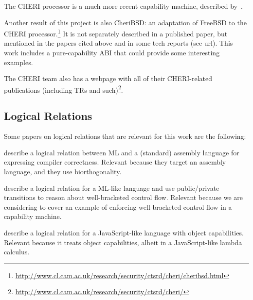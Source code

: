 \documentclass[a4paper]{article}
\begin{document}
The CHERI processor is a much more recent capability machine, described
by~\cite{Woodruff:2014:CCM:2665671.2665740,Watson2015Cheri}.

Another result of this project is also CheriBSD: an adaptation of FreeBSD to the
CHERI
processor.\footnote{\url{http://www.cl.cam.ac.uk/research/security/ctsrd/cheri/cheribsd.html}}
It is not separately described in a published paper, but mentioned in the papers
cited above and in some tech reports (see url). This work includes a
pure-capability ABI that could provide some interesting examples.

The CHERI team also has a webpage with all of their CHERI-related publications
(including TRs and
such)\footnote{\url{http://www.cl.cam.ac.uk/research/security/ctsrd/cheri/}}.

\subsection{Logical Relations}
\label{sec:rw-log-rel}

Some papers on logical relations that are relevant for this work are the
following:

\cite{Hur:2011:KLR:1926385.1926402} describe a logical relation between ML and
a (standard) assembly language for expressing compiler correctness.  Relevant
because they target an assembly language, and they use biorthogonality.

\cite{Dreyer:2010:IHS:1863543.1863566} describe a logical relation for a ML-like
language and use public/private transitions to reason about well-bracketed
control flow. Relevant because we are considering to cover an example of
enforcing well-bracketed control flow in a capability machine.

\cite{Devriese:2016ObjCap} describe a logical relation for a JavaScript-like
language with object capabilities.  Relevant because it treats object
capabilities, albeit in a JavaScript-like lambda calculus.



\end{document}

